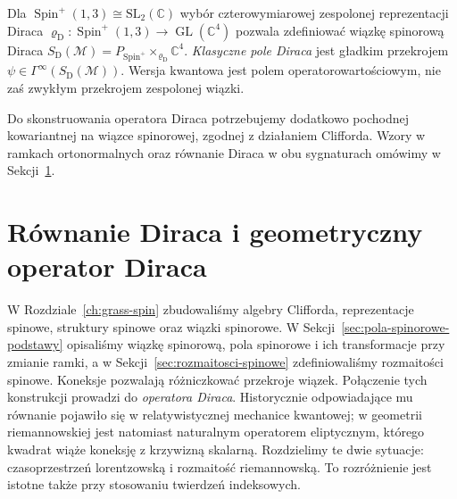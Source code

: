 Dla $\operatorname{Spin}^+(1,3)\cong\mathrm{SL}_2(\mathbb C)$
wybór czterowymiarowej zespolonej reprezentacji Diraca
$\varrho_{\mathrm D}:\operatorname{Spin}^+(1,3)
\to\operatorname{GL}(\mathbb C^4)$ pozwala zdefiniować
wiązkę spinorową Diraca
$S_{\mathrm D}(\mathcal M)
=P_{\operatorname{Spin}^+}\times_{\varrho_{\mathrm D}}\mathbb C^4$.
\emph{Klasyczne pole Diraca} jest gładkim przekrojem
$\psi\in\Gamma^\infty(S_{\mathrm D}(\mathcal M))$.
Wersja kwantowa jest polem operatorowartościowym,
nie zaś zwykłym przekrojem zespolonej wiązki.

\begin{uwaga}
Do skonstruowania operatora Diraca potrzebujemy
dodatkowo pochodnej kowariantnej na wiązce spinorowej,
zgodnej z działaniem Clifforda. Wzory w ramkach
ortonormalnych oraz równanie Diraca w obu sygnaturach
omówimy w Sekcji~\ref{sec:rownanie-diraca}.
\end{uwaga}





\section{Równanie Diraca i geometryczny operator Diraca}
\label{sec:rownanie-diraca}

W Rozdziale~\ref{ch:grass-spin} zbudowaliśmy
algebry Clifforda, reprezentacje spinowe,
struktury spinowe oraz wiązki spinorowe.
W Sekcji~\ref{sec:pola-spinorowe-podstawy} opisaliśmy
wiązkę spinorową, pola spinorowe i ich transformacje
przy zmianie ramki, a w Sekcji~\ref{sec:rozmaitosci-spinowe}
zdefiniowaliśmy rozmaitości spinowe.
Koneksje pozwalają różniczkować przekroje wiązek.
Połączenie tych konstrukcji prowadzi
do \emph{operatora Diraca}. Historycznie odpowiadające mu równanie
pojawiło się w relatywistycznej mechanice kwantowej; w geometrii
riemannowskiej jest natomiast naturalnym operatorem eliptycznym,
którego kwadrat wiąże koneksję z krzywizną skalarną.
Rozdzielimy te dwie sytuacje: czasoprzestrzeń lorentzowską
i rozmaitość riemannowską. To rozróżnienie jest istotne także
przy stosowaniu twierdzeń indeksowych.

